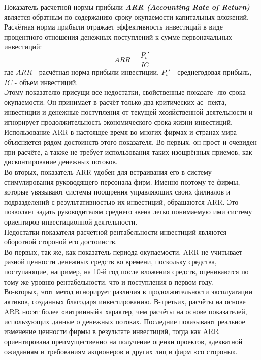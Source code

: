 \documentclass[a4paper,12pt]{article}
\begin{document}
Показатель расчетной нормы прибыли \textit{\textbf{ARR (Accounting Rate of
Return)}} является обратным по содержанию сроку окупаемости капитальных вложений.
Расчётная норма прибыли отражает эффективность инвестиций в
виде процентного отношения денежных поступлений к сумме первоначальных инвестиций:
\begin{equation}
	ARR = \frac{{P_t}\prime}{IC}	
\end{equation}
где ${ARR}$ - расчётная норма прибыли инвестиции, ${{P_t} \prime}$ - среднегодовая прибыль, ${IC}$ - объем инвестиций.\\
Этому показателю присущи все недостатки, свойственные показате-
лю срока окупаемости. Он принимает в расчёт только два критических ас-
пекта, инвестиции и денежные поступления от текущей хозяйственной
деятельности и игнорирует продолжительность экономического срока
жизни инвестиций.\\
Использование ARR в настоящее время во многих фирмах и странах
мира объясняется рядом достоинств этого показателя. Во-первых, он
прост и очевиден при расчёте, а также не требует использования таких
изощрённых приемов, как дисконтирование денежных потоков.\\
Во-вторых, показатель ARR удобен для встраивания его в систему
стимулирования руководящего персонала фирм. Именно поэтому те фирмы, которые увязывают системы поощрения управляющих своих филиалов и подразделений с результативностью их инвестиций, обращаются ARR. Это позволяет задать руководителям среднего звена легко понимаемую ими систему ориентиров инвестиционной деятельности.\\
Недостатки показателя расчётной рентабельности инвестиций являются оборотной стороной его достоинств.\\
Во-первых, так же, как показатель периода окупаемости, ARR не учитывает разной ценности денежных
средств во времени, поскольку средства, поступающие, например, на 10-й
год после вложения средств, оцениваются по тому же уровню рентабельности, что и поступления в первом году.\\ 
Во-вторых, этот метод игнорирует различия в продолжительности эксплуатации активов, созданных благодаря инвестированию. В-третьих, расчёты на основе ARR носят более «витринный» характер, чем расчёты на основе показателей, использующих данные о денежных потоках. Последние показывают реальное изменение ценности фирмы в результате инвестиций, тогда как ARR ориентирована преимущественно на получение оценки проектов, адекватной ожиданиям и требованиям акционеров и других лиц и фирм «со стороны».
\end{document}
